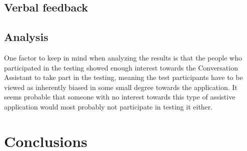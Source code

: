 \documentclass[english, 12pt, a4paper, pdftex, elec, utf8]{aaltothesis}
\begin{document}
\subsection{Verbal feedback}

\subsection{Analysis}

One factor to keep in mind when analyzing the results is that the people who participated in the testing showed enough interest towards the Conversation Assistant to take part in the testing, meaning the test participants have to be viewed as inherently biased in some small degree towards the application. It seems probable that someone with no interest towards this type of assistive application would most probably not participate in testing it either.

\clearpage

\section{Conclusions} \label{sec:loppu}
\end{document}
